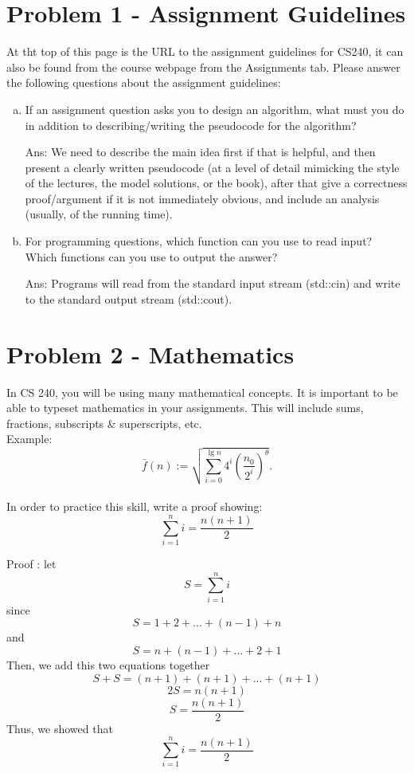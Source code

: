 \documentclass[12pt]{article}
\begin{document}

\section*{Problem 1 - Assignment Guidelines}
At tht top of this page is the URL to the assignment guidelines for CS240, it can also be found from the course webpage from the Assignments tab. Please answer the following questions about the assignment guidelines:

\begin{enumerate}[a)] 
	\item If an assignment question asks you to design an algorithm, what must you do in addition to describing/writing the pseudocode for the algorithm?
	
	Ans: We need to describe the main idea first if that is helpful,
and then present a clearly written pseudocode (at a level of detail mimicking the style of the lectures, the model solutions, or the book), after that give a correctness proof/argument if it is not immediately obvious, and include an analysis (usually, of the running time).

	\item For programming questions, which function can you use to read input? \\ Which functions can you use to output the answer?
	
	Ans: Programs will read from the standard input stream (std::cin) and write to the standard output stream (std::cout). 
	
\end{enumerate}

\section*{Problem 2 - Mathematics}
In CS 240, you will be using many mathematical concepts. It is important to be able to typeset mathematics in your assignments. This will include sums, fractions, subscripts \& superscripts, etc. \\
Example: 
$$\bar{f}(n) := \sqrt {\sum_{i=0}^{\lg n} 4^i \left ( \frac{n_0}{2^i} \right )^{\theta}}.$$
\\
In order to practice this skill, write a proof showing: $$\sum_{i=1}^n i = \frac {n(n+1)} {2}$$


Proof :  let $$ S = \sum_{i=1}^n i$$
         since $$ S = 1+2+...+(n−1)+n$$
         and $$ S = n+(n−1)+...+2+1$$
         Then, we add this two equations together
         $$ S + S = (n+1)+(n+1)+...+(n+1) $$
         $$ 2S = n(n+1) $$
         $$ S = \frac {n(n+1)} {2}$$
         Thus, we showed that 
         $$\sum_{i=1}^n i = \frac {n(n+1)} {2}$$
         
\end{document}
